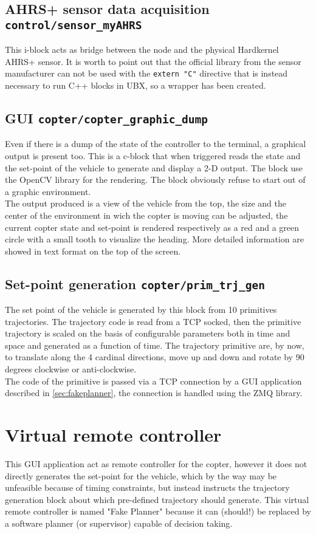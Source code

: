 \subsection{AHRS+ sensor data acquisition \texttt{control/sensor\_myAHRS}}
This i-block acts as bridge between the node and the physical Hardkernel AHRS+ sensor. It is worth to point out that the official library from the sensor manufacturer can not be used with the \texttt{extern "C"} directive that is instead necessary to run C++ blocks in UBX, so a wrapper has been created.

\subsection{GUI \texttt{copter/copter\_graphic\_dump}}
Even if there is a dump of the state of the controller to the terminal, a graphical output is present too. This is a c-block that when triggered reads the state and the set-point of the vehicle to generate and display a 2-D output. The block use the OpenCV library for the rendering. The block obviously refuse to start out of a graphic environment.\\
The output produced is a view of the vehicle from the top, the size and the center of the environment in wich the copter is moving can be adjusted, the current copter state and set-point is rendered respectively as a red and a green circle with a small tooth to visualize the heading. More detailed information are showed in text format on the top of the screen.

\subsection{Set-point generation \texttt{copter/prim\_trj\_gen}}
The set point of the vehicle is generated by this block from 10 primitives trajectories. The trajectory code is read from a TCP socked, then the primitive trajectory is scaled on the basis of configurable parameters both in time and space and generated as a function of time. The trajectory primitive are, by now, to translate along the 4 cardinal directions, move up and down and rotate by 90 degrees clockwise or anti-clockwise.\\
The code of the primitive is passed via a TCP connection by a GUI application described in \autoref{sec:fakeplanner}, the connection is handled using the ZMQ\cite{bib:ZMQ} library.

\section{Virtual remote controller}
\label{sec:fakeplanner}
 This GUI application act as remote controller for the copter, however it does not directly generates the set-point for the vehicle, which by the way may be unfeasible because of timing constraints, but instead instructs the trajectory generation block about which pre-defined trajectory should generate. This virtual remote controller is named "Fake Planner" because it can (should!) be replaced by a software planner (or supervisor) capable of decision taking.
 